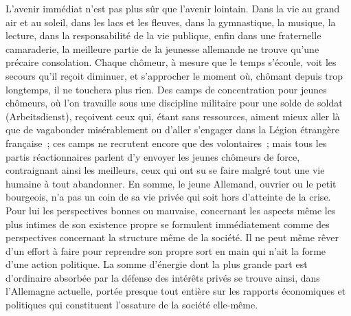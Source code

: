 \documentclass[french,twoside]{book} %
\begin{document}
L'avenir immédiat n'est pas plus sûr que l'avenir lointain. Dans la vie au grand air et au soleil, dans les lacs et les fleuves, dans la gymnastique, la musique, la lecture, dans la responsabilité de la vie publique, enfin dans une fraternelle camaraderie, la meilleure partie de la jeunesse allemande ne trouve qu'une précaire consolation. Chaque chômeur, à mesure que le temps s'écoule, voit les secours qu'il reçoit diminuer, et s'approcher le moment où, chômant depuis trop longtemps, il ne touchera plus rien. Des camps de concentration pour jeunes chômeurs, où l'on travaille sous une discipline militaire pour une solde de soldat (Arbeitsdienst), reçoivent ceux qui, étant sans ressources, aiment mieux aller là que de vagabonder misérablement ou d'aller s'engager dans la Légion étrangère française ; ces camps ne recrutent encore que des volontaires ; mais tous les partis réactionnaires parlent d'y envoyer les jeunes chômeurs de force, contraignant ainsi les meilleurs, ceux qui ont su se faire malgré tout une vie humaine à tout abandonner. En somme, le jeune Allemand, ouvrier ou le petit bourgeois, n'a pas un coin de sa vie privée qui soit hors d'atteinte de la crise. Pour lui les perspectives bonnes ou mauvaise, concernant les aspects même les plus intimes de son existence propre se formulent immédiatement comme des perspectives concernant la structure même de la société. Il ne peut même rêver d'un effort à faire pour reprendre son propre sort en main qui n'ait la forme d'une action politique. La somme d'énergie dont la plus grande part est d'ordinaire absorbée par la défense des intérêts privés se trouve ainsi, dans l'Allemagne actuelle, portée presque tout entière sur les rapports économiques et politiques qui constituent l'ossature de la société elle-même.\par
\end{document}
